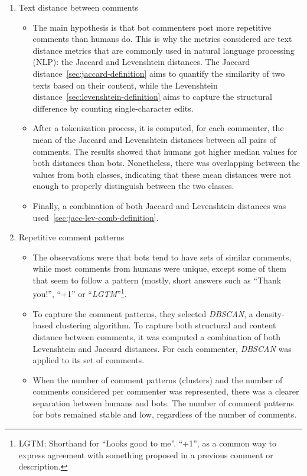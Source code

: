 \documentclass[a4paper, 12pt]{book}
\begin{document}
\begin{enumerate}
    \item Text distance between comments
    \begin{itemize}
        \item The main hypothesis is that bot commenters post more repetitive comments than humans do. This is why the metrics considered are text distance metrics that are commonly used in natural language processing (NLP): the Jaccard and Levenshtein distances. The Jaccard distance~\ref{sec:jaccard-definition} aims to quantify the similarity of two texts based on their content, while the Levenshtein distance~\ref{sec:levenshtein-definition} aims to capture the structural difference by counting single-character edits.
        \item After a tokenization process, it is computed, for each commenter, the mean of the Jaccard and Levenshtein distances between all pairs of comments. The results showed that humans got higher median values for both distances than bots. Nonetheless, there was overlapping between the values from both classes, indicating that these mean distances were not enough to properly distinguish between the two classes.
        \item Finally, a combination of both Jaccard and Levenshtein distances was used~\ref{sec:jacc-lev-comb-definition}.
    \end{itemize}
    \item Repetitive comment patterns
        \begin{itemize}
            \item The observations were that bots tend to have sets of similar comments, while most comments from humans were unique, except some of them that seem to follow a pattern (mostly, short answers such as ``Thank you!'', ``+1'' or ``\textit{LGTM}''\footnote{ LGTM: Shorthand for ``Looks good to me''. ``+1'', as a common way to express agreement with something proposed in a previous comment or description.}.
            \item To capture the comment patterns, they selected \textit{DBSCAN}, a density-based clustering algorithm. To capture both structural and content distance between comments, it was computed a combination of both Levenshtein and Jaccard distances. For each commenter, \textit{DBSCAN} was applied to its set of comments.
            \item When the number of comment patterns (clusters) and the number of comments considered per commenter was represented, there was a clearer separation between humans and bots. The number of comment patterns for bots remained stable and low, regardless of the number of comments.

\end{itemize}
\end{enumerate}
\end{document}
